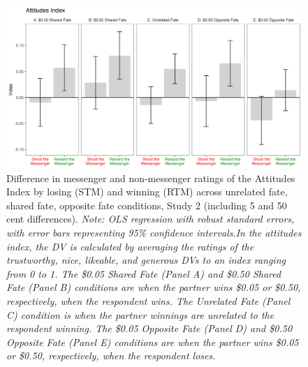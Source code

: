 \renewcommand{\baselinestretch}{1.25}%
\begin{figure}[!t]%
  \centering
  \includegraphics[width=1.0\textwidth]{figures/study2_main_fivecent_attitude_all.png}
  \caption{Difference in messenger and non-messenger ratings of the Attitudes Index by losing (STM) and winning (RTM) across unrelated fate, shared fate, opposite fate conditions, Study 2 (including 5 and 50 cent differences). 
  \textit{Note: OLS regression with robust standard errors, with error bars representing 95\% confidence intervals.In the attitudes index, the DV is calculated by averaging the ratings of the trustworthy, nice, likeable, and generous DVs to an index ranging from 0 to 1. The \$0.05 Shared Fate (Panel A) and \$0.50 Shared Fate (Panel B) conditions are when the partner wins \$0.05 or \$0.50, respectively, when the respondent wins. The Unrelated Fate (Panel C) condition is when the partner winnings are unrelated to the respondent winning. The \$0.05 Opposite Fate (Panel D) and \$0.50 Opposite Fate (Panel E) conditions are when the partner wins \$0.05 or \$0.50, respectively, when the respondent loses.}}
  \label{fig:study2_main_fivecent_attitude_all}
\end{figure}%
\renewcommand{\baselinestretch}{1.67}%
